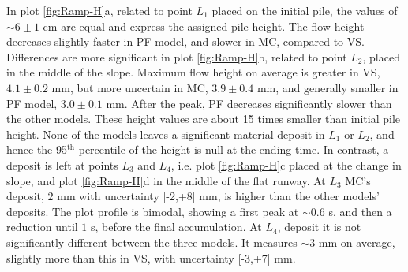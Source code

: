 \documentclass{article}
\begin{document}
In plot \ref{fig:Ramp-H}a, related to point $L_1$ placed on the initial pile, the values of $\sim 6\pm 1$ cm are equal and express the assigned pile height. The flow height decreases slightly faster in PF model, and slower in MC, compared to VS. Differences are more significant in plot \ref{fig:Ramp-H}b, related to point $L_2$, placed in the middle of the slope. Maximum flow height on average is greater in VS, $4.1\pm 0.2$ mm, but more uncertain in MC, $3.9\pm 0.4$ mm, and generally smaller in PF model, $3.0\pm 0.1$ mm. After the peak, PF decreases significantly slower than the other models. These height values are about 15 times smaller than initial pile height. None of the models leaves a significant material deposit in $L_1$ or $L_2$, and hence the 95$^{\mathrm{th}}$ percentile of the height is null at the ending-time. In contrast, a deposit is left at points $L_3$ and $L_4$, i.e. plot \ref{fig:Ramp-H}c placed at the change in slope, and plot \ref{fig:Ramp-H}d in the middle of the flat runway. At $L_3$ MC's deposit, $2$ mm with uncertainty [-2,+8] mm, is higher than the other models' deposits. The plot profile is bimodal, showing a first peak at $\sim 0.6$ s, and then a reduction until $1$ s, before the final accumulation. At $L_4$, deposit it is not significantly different between the three models. It measures $\sim 3$ mm on average, slightly more than this in VS, with uncertainty [-3,+7] mm.
\end{document}
